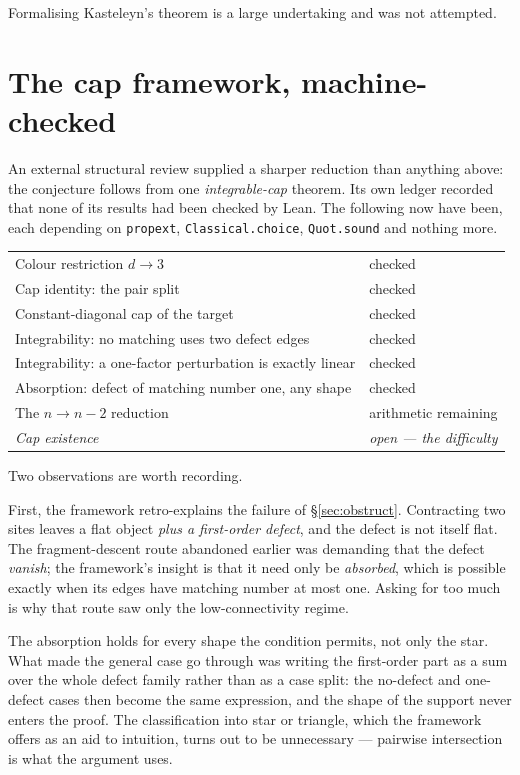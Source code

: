 \documentclass[11pt]{article}
\theoremstyle{definition}
\theoremstyle{remark}
\begin{document}
Formalising Kasteleyn's theorem is a large undertaking and was not attempted.

\section{The cap framework, machine-checked}

An external structural review supplied a sharper reduction than anything above: the
conjecture follows from one \emph{integrable-cap} theorem. Its own ledger recorded
that none of its results had been checked by Lean. The following now have been, each
depending on \texttt{propext}, \texttt{Classical.choice}, \texttt{Quot.sound} and
nothing more.

\begin{center}
\begin{tabular}{ll}
\hline
Colour restriction $d\to3$ & checked\\
Cap identity: the pair split & checked\\
Constant-diagonal cap of the target & checked\\
Integrability: no matching uses two defect edges & checked\\
Integrability: a one-factor perturbation is exactly linear & checked\\
Absorption: defect of matching number one, any shape & checked\\
The $n\to n-2$ reduction & arithmetic remaining\\
\emph{Cap existence} & \emph{open --- the difficulty}\\
\hline
\end{tabular}
\end{center}

Two observations are worth recording.

First, the framework retro-explains the failure of \S\ref{sec:obstruct}. Contracting
two sites leaves a flat object \emph{plus a first-order defect}, and the defect is not
itself flat. The fragment-descent route abandoned earlier was demanding that the
defect \emph{vanish}; the framework's insight is that it need only be
\emph{absorbed}, which is possible exactly when its edges have matching number at
most one. Asking for too much is why that route saw only the low-connectivity regime.

The absorption holds for every shape the condition permits, not only the star. What
made the general case go through was writing the first-order part as a sum over the
whole defect family rather than as a case split: the no-defect and one-defect cases
then become the same expression, and the shape of the support never enters the
proof. The classification into star or triangle, which the framework offers as an
aid to intuition, turns out to be unnecessary --- pairwise intersection is what the
argument uses.
\end{document}

